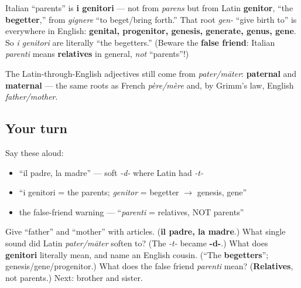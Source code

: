 \begin{cousinweb}
Italian \textquotedblleft{}parents\textquotedblright{} is \textbf{i genitori} — not from \emph{parens} but from Latin \textbf{genitor}, \textquotedblleft{}the \textbf{begetter},\textquotedblright{} from \emph{gignere} \textquotedblleft{}to beget/bring forth.\textquotedblright{} That root \emph{gen-} \textquotedblleft{}give birth to\textquotedblright{} is everywhere in English: \textbf{genital, progenitor, genesis, generate, genus, gene}. So \emph{i genitori} are literally \textquotedblleft{}the begetters.\textquotedblright{} (Beware the \textbf{false friend}: Italian \emph{parenti} means \textbf{relatives} in general, \emph{not} \textquotedblleft{}parents\textquotedblright{}!)

The Latin-through-English adjectives still come from \emph{pater/māter}: \textbf{paternal} and \textbf{maternal} — the same roots as French \emph{père/mère} and, by Grimm's law, English \emph{father/mother}.
\end{cousinweb}

\subsection*{Your turn}
Say these aloud:

\begin{itemize}
\raggedright
  \item \textquotedblleft{}il padre, la madre\textquotedblright{} — soft \emph{-d-} where Latin had \emph{-t-}
  \item \textquotedblleft{}i genitori = the parents; \emph{genitor} = begetter $\to$ genesis, gene\textquotedblright{}
  \item the false-friend warning — \textquotedblleft{}\emph{parenti} = relatives, NOT parents\textquotedblright{}
\end{itemize}

\begin{tcolorbox}[breakable,colback=teal!4,colframe=teal!35!black,title={Before you move on}]
Give \textquotedblleft{}father\textquotedblright{} and \textquotedblleft{}mother\textquotedblright{} with articles. (\textbf{il padre, la madre}.) What single sound did Latin \emph{pater/māter} soften to? (The \emph{-t-} became \textbf{-d-}.) What does \textbf{genitori} literally mean, and name an English cousin. (\textquotedblleft{}The \textbf{begetters}\textquotedblright{}; genesis/gene/progenitor.) What does the false friend \emph{parenti} mean? (\textbf{Relatives}, not parents.) Next: brother and sister.
\end{tcolorbox}

